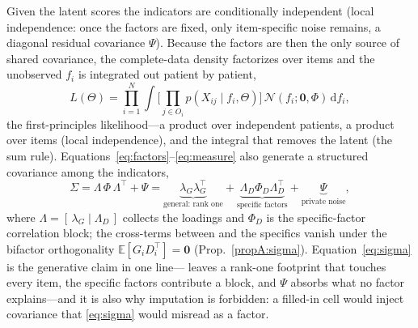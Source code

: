 Given the latent scores the indicators are conditionally independent (local
independence: once the factors are fixed, only item-specific noise remains, a diagonal
residual covariance $\Psi$). Because the factors are then the only source of shared
covariance, the complete-data density factorizes over items and the unobserved $f_i$ is
integrated out patient by patient,
\begin{equation}
  L(\Theta)=\prod_{i=1}^{N}\int\Big[\textstyle\prod_{j\in O_i} p(X_{ij}\mid f_i,\Theta)\Big]\,
  \mathcal N(f_i;\mathbf 0,\Phi)\,\mathrm{d}f_i ,
  \label{eq:m-fulllik}
\end{equation}
the first-principles likelihood---a product over independent patients, a product over items
(local independence), and the integral that removes the latent (the sum rule).
Equations~\eqref{eq:factors}--\eqref{eq:measure} also generate a structured covariance among
the indicators,
\begin{equation}
  \Sigma=\Lambda\,\Phi\,\Lambda^{\top}+\Psi
        =\underbrace{\lambda_G\lambda_G^{\top}}_{\text{general: rank one}}
         +\underbrace{\Lambda_D\Phi_D\Lambda_D^{\top}}_{\text{specific factors}}
         +\underbrace{\Psi}_{\text{private noise}},
  \label{eq:sigma}
\end{equation}
where $\Lambda=[\,\lambda_G\mid\Lambda_D\,]$ collects the loadings and $\Phi_D$ is the
specific-factor correlation block; the cross-terms between \Gfac{} and the specifics vanish
under the bifactor orthogonality $\mathbb E[G_iD_i^{\top}]=\mathbf 0$
(Prop.~\ref{propA:sigma}). Equation~\eqref{eq:sigma} is the generative claim in one
line---\Gfac{} leaves a rank-one footprint that touches every item, the specific factors
contribute a block, and $\Psi$ absorbs what no factor explains---and it is also why imputation
is forbidden: a filled-in cell would inject covariance that \eqref{eq:sigma} would misread as
a factor.


